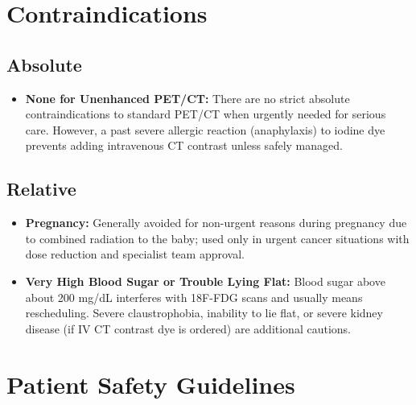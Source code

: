 \section{Contraindications}

\subsection{Absolute}

\begin{itemize}
    \item \textbf{None for Unenhanced PET/CT:} There are no strict absolute contraindications to standard PET/CT when urgently needed for serious care. However, a past severe allergic reaction (anaphylaxis) to iodine dye prevents adding intravenous CT contrast unless safely managed.
\end{itemize}

\subsection{Relative}

\begin{itemize}
    \item \textbf{Pregnancy:} Generally avoided for non-urgent reasons during pregnancy due to combined radiation to the baby; used only in urgent cancer situations with dose reduction and specialist team approval.
    \item \textbf{Very High Blood Sugar or Trouble Lying Flat:} Blood sugar above about 200 mg/dL interferes with 18F-FDG scans and usually means rescheduling. Severe claustrophobia, inability to lie flat, or severe kidney disease (if IV CT contrast dye is ordered) are additional cautions.
\end{itemize}

\section{Patient Safety Guidelines}

